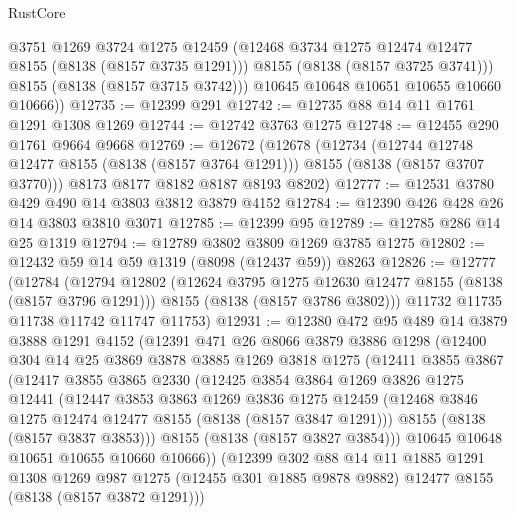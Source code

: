 \begin{lexlean}{RustCore}
\begin{coremodule}
            @3751
            @1269
            @3724
            @1275
            @12459
            (@12468 @3734 @1275 @12474 @12477 @8155 (@8138 (@8157 @3735 @1291)))
            @8155
            (@8138 (@8157 @3725 @3741)))
          @8155
          (@8138 (@8157 @3715 @3742)))
        @10645
        @10648
        @10651
        @10655
        @10660
        @10666))
@12735 := @12399 @291
@12742 := @12735 @88 @14 @11 @1761 @1291 @1308 @1269
@12744 := @12742 @3763 @1275
@12748 := @12455 @290 @1761 @9664 @9668
@12769 := @12672
    (@12678
      (@12734
        (@12744 @12748 @12477 @8155 (@8138 (@8157 @3764 @1291)))
        @8155
        (@8138 (@8157 @3707 @3770)))
      @8173
      @8177
      @8182
      @8187
      @8193
      @8202)
@12777 := @12531 @3780 @429 @490 @14 @3803 @3812 @3879 @4152
@12784 := @12390 @426 @428 @26 @14 @3803 @3810 @3071
@12785 := @12399 @95
@12789 := @12785 @286 @14 @25 @1319
@12794 := @12789 @3802 @3809 @1269 @3785 @1275
@12802 := @12432 @59 @14 @59 @1319 (@8098 (@12437 @59)) @8263
@12826 := @12777
    (@12784
      (@12794
        @12802
        (@12624 @3795 @1275 @12630 @12477 @8155 (@8138 (@8157 @3796 @1291)))
        @8155
        (@8138 (@8157 @3786 @3802)))
      @11732
      @11735
      @11738
      @11742
      @11747
      @11753)
@12931 := @12380
    @472
    @95
    @489
    @14
    @3879
    @3888
    @1291
    @4152
    (@12391
      @471
      @26
      @8066
      @3879
      @3886
      @1298
      (@12400
        @304
        @14
        @25
        @3869
        @3878
        @3885
        @1269
        @3818
        @1275
        (@12411
          @3855
          @3867
          (@12417
            @3855
            @3865
            @2330
            (@12425
              @3854
              @3864
              @1269
              @3826
              @1275
              @12441
              (@12447
                @3853
                @3863
                @1269
                @3836
                @1275
                @12459
                (@12468 @3846 @1275 @12474 @12477 @8155 (@8138 (@8157 @3847 @1291)))
                @8155
                (@8138 (@8157 @3837 @3853)))
              @8155
              (@8138 (@8157 @3827 @3854)))
            @10645
            @10648
            @10651
            @10655
            @10660
            @10666))
        (@12399
          @302
          @88
          @14
          @11
          @1885
          @1291
          @1308
          @1269
          @987
          @1275
          (@12455 @301 @1885 @9878 @9882)
          @12477
          @8155
          (@8138 (@8157 @3872 @1291)))

\end{coremodule}
\end{lexlean}
